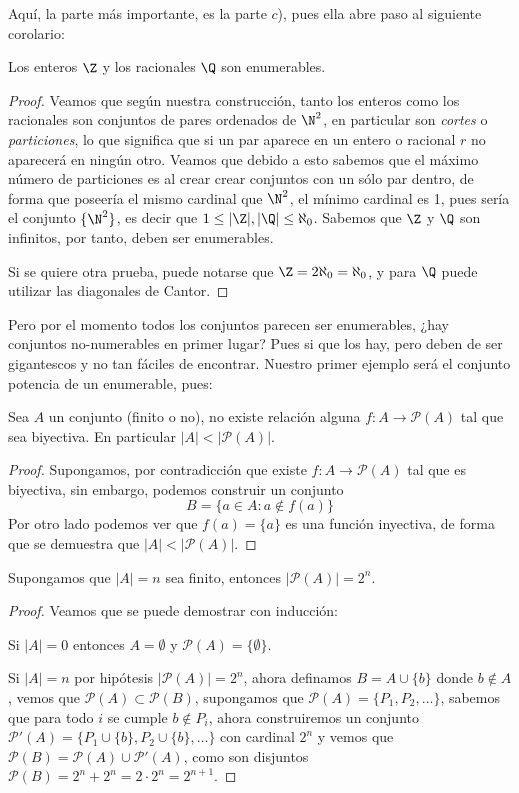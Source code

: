 \documentclass[11pt,oneside,a4paper]{book}
\renewcommand{\P}{\mathcal{P}}
\begin{document}
Aquí, la parte más importante, es la parte $c$), pues ella abre paso al siguiente corolario:
\begin{cor}
Los enteros $\Z$ y los racionales $\Q$ son enumerables.
\end{cor}
\begin{proof}
Veamos que según nuestra construcción, tanto los enteros como los racionales son conjuntos de pares ordenados de $\N^2$, en particular son \textit{cortes} o \textit{particiones}, lo que significa que si un par aparece en un entero o racional $r$ no aparecerá en ningún otro. Veamos que debido a esto sabemos que el máximo número de particiones es al crear crear conjuntos con un sólo par dentro, de forma que poseería el mismo cardinal que $\N^2$, el mínimo cardinal es 1, pues sería el conjunto $\{\N^2\}$, es decir que $1\leq|\Z|,|\Q|\leq\aleph_0$. Sabemos que $\Z$ y $\Q$ son infinitos, por tanto, deben ser enumerables.

Si se quiere otra prueba, puede notarse que $\Z=2\aleph_0=\aleph_0$, y para $\Q$ puede utilizar las diagonales de Cantor.
\end{proof}
Pero por el momento todos los conjuntos parecen ser enumerables, ¿hay conjuntos no-numerables en primer lugar? Pues si que los hay, pero deben de ser gigantescos y no tan fáciles de encontrar. Nuestro primer ejemplo será el conjunto potencia de un enumerable, pues:
\begin{thm}
Sea $A$ un conjunto (finito o no), no existe relación alguna $f:A\rightarrow\P(A)$ tal que sea biyectiva. En particular $|A|\lt|\P(A)|$.
\end{thm}
\begin{proof}
Supongamos, por contradicción que existe $f:A\rightarrow\P(A)$ tal que es biyectiva, sin embargo, podemos construir un conjunto
$$B=\{a\in A:a\notin f(a)\}$$
Por otro lado podemos ver que $f(a)=\{a\}$ es una función inyectiva, de forma que se demuestra que $|A|\lt|\P(A)|$.
\end{proof}
\begin{thm}
Supongamos que $|A|=n$ sea finito, entonces $|\P(A)|=2^n$.
\end{thm}
\begin{proof}
Veamos que se puede demostrar con inducción:

Si $|A|=0$ entonces $A=\emptyset$ y $\P(A)=\{\emptyset\}$.

Si $|A|=n$ por hipótesis $|\P(A)|=2^n$, ahora definamos $B=A\cup\{b\}$ donde $b\notin A$, vemos que $\P(A)\subset\P(B)$, supongamos que $\P(A)=\{P_1,P_2,\dots\}$, sabemos que para todo $i$ se cumple $b\notin P_i$, ahora construiremos un conjunto $\P'(A)=\{P_1\cup\{b\},P_2\cup\{b\},\dots\}$ con cardinal $2^n$ y vemos que $\P(B)=\P(A)\cup\P'(A)$, como son disjuntos $\P(B)=2^n+2^n=2\cdot2^n=2^{n+1}$.
\end{proof}
\end{document}
